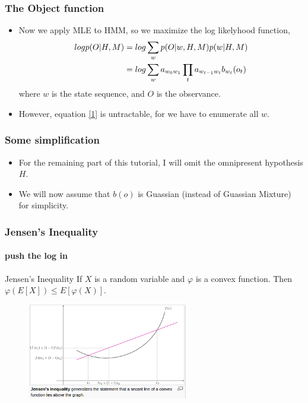 \documentclass{beamer}
\begin{document}
\begin{frame}
\frametitle{The Object function}
\begin{itemize}
	\item Now we apply MLE to HMM, so we maximize the log likelyhood function, 
	\begin{equation}{\label{1}}
	\begin{split}
		logp(O|H,M) &= log \sum_{w}p(O|w,H,M)p(w|H,M) \\
		& = log \sum_{w}a_{w_0w_1}
			\prod_{t}a_{w_{t-1}w_t}b_{w_t}(o_t) 
	\end{split}
	\end{equation}
	where $w$ is the state sequence, and $O$ is the observance.
	\item However, equation \ref{1} is untractable, for we have to enumerate all $w$.
\end{itemize}
\end{frame}

\begin{frame}
\frametitle{Some simplification}
\begin{itemize}
	\item For the remaining part of this tutorial, I will omit the omnipresent hypothesis $H$. \
	\item We will now assume that $b(o)$ is Guassian (instead of Guassian Mixture) for simplicity.
\end{itemize}
\end{frame}

\begin{frame}
\frametitle{Jensen's Inequality}
\framesubtitle{push the log in}
\begin{block}{Jensen's Inequality}
If $X$ is a random variable and $\varphi$ is a convex function.
Then $\varphi(E[X]) \leq E[\varphi(X)]$.
\begin{figure}
\includegraphics[width=200pt]{jensen.png}
\end{figure}
\end{block}
\end{frame}
\end{document}
